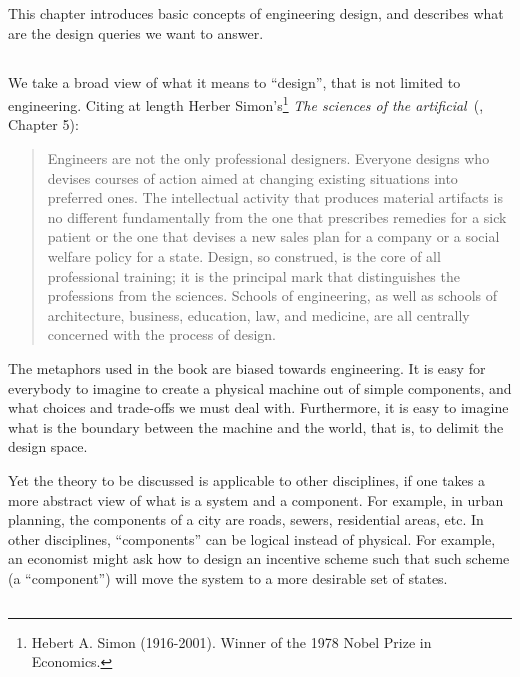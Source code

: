 This chapter introduces basic concepts of engineering design, and describes what are the design queries we want to answer.


\subsection{}

We take a broad view of what it means to ``design'', that is not limited to engineering. Citing at length 
Herber Simon's\footnote{Hebert A. Simon (1916-2001). Winner of the 1978 Nobel Prize in Economics.}
\emph{The sciences of the artificial}~(\cite{hebert96sciences}, Chapter 5):

\begin{quote}
    Engineers are not the only professional designers. Everyone designs who devises courses of action aimed at changing existing situations into preferred ones. The intellectual activity that produces material artifacts is no different fundamentally from the one that prescribes remedies for a sick patient or the one that devises a new sales plan for a company or a social welfare policy for a state. Design, so construed, is the core of all professional training; it is the principal mark that distinguishes the professions from the sciences. Schools of engineering, as well as schools of architecture, business, education, law, and medicine, are all centrally concerned with the process of design.
\end{quote} 

The metaphors used in the book are biased towards engineering.
It is easy for everybody to imagine to create a physical machine out of simple components,
and what choices and trade-offs we must deal with. Furthermore, it is easy to imagine
what is the boundary between the machine and the world, that is, to delimit the design space.

Yet the theory to be discussed is applicable to other disciplines, if one takes a more
abstract view of what is a system and a component. For example, in urban planning, the
components of a city are roads, sewers, residential areas, etc. In other disciplines,
``components'' can be logical instead of physical. For example, an economist might ask how to
design an incentive scheme such that such scheme (a ``component'') will move the system to a more
desirable set of states.


\subsection{}


